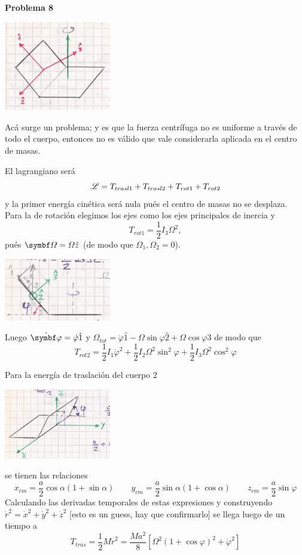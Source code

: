 \documentclass[10pt,oneside]{CBFT_book}
\begin{document}
\begin{ejemplo}{\bf Problema 8}

\includegraphics[width=0.35\textwidth]{images/fig_mc_prob8_1.jpg}

Acá surge un problema; y es que la fuerza centrífuga no es uniforme a través de todo el cuerpo, entonces
no es válido que vale considerarla aplicada en el centro de masas.

El lagrangiano será 
\[
	\mathscr{L} = T_{trasl1} + T_{trasl2} + T_{rot1} + T_{rot2}
\]
y la primer energía cinética será nula pués el centro de masas no se desplaza. Para la de rotación elegimos
los ejes como los ejes principales de inercia y 
\[
	T_{rot1} = \frac 1 2 I_3 \Omega^2,
\]
pués $\vb{\Omega} = \Omega\hat{z}$ (de modo que $\Omega_1,\Omega_2=0$). 

\includegraphics[width=0.35\textwidth]{images/fig_mc_prob8_2.jpg}

Luego $\dot{\vb{\varphi}} = \dot{\varphi} \hat{1}$ y $\Omega_{tot} = \dot{\varphi} \hat{1} - \Omega \sin \varphi \hat{2} +
\Omega \cos \varphi \hat{3} $ de modo que 
\[
	T_{rot2} = \frac 1 2 I_1 \dot{\varphi}^2 + \frac 1 2 I_2 \Omega^2 \sin^2 \varphi + \frac 1 2 I_3 \Omega^2 \cos^2 \varphi
\]

Para la energía de traslación del cuerpo 2

\includegraphics[width=0.35\textwidth]{images/fig_mc_prob8_3.jpg}

se tienen las relaciones
\[
	x_{cm} = \frac a 2 \cos\alpha (1+\sin\alpha) \qquad 
	y_{cm} = \frac a 2 \sin\alpha (1+\cos\alpha) \qquad 
	z_{cm} = \frac a 2 \sin \varphi
\]
Calculando las derivadas temporales de estas expresiones y construyendo $\dot{r}^2=\dot{x}^2+\dot{y}^2+\dot{z}^2$ [esto es
un guess, hay que confirmarlo] se llega luego de un tiempo a
\[
	T_{tras} = \frac 1 2 M \dot{r}^2 = \frac{Ma^2}{8}\left[ \Omega^2( 1 + \cos\varphi )^2 + \dot{\varphi}^2 \right]
\]


\end{ejemplo}
\end{document}
